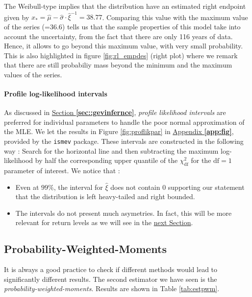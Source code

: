 The Weibull-type implies that the distribution have an estimated right endpoint given by $\hat{x}_*=\hat{\mu}-\hat{\sigma}\cdot\hat{\xi}^{-1}=38.77$. Comparing this value with the maximum value of the series (=36.6) tells us that the sample properties of this model take into account the uncertainty, from the fact that there are only 116 years of data. Hence, it allows to go beyond this maximum value, with very small probability. This is also highlighted in figure \ref{fig:rl_empdes} (right plot) where we remark that there are still probabiliy mass beyond the minimum and the maximum values of the series.

\paragraph*{Profile log-likelihood intervals} 
As discussed in \hyperref[sec:g]{Section \textbf{\ref{sec::gevinfernce}}}, \emph{profile likelihood intervals} are preferred for individual parameters to handle the poor normal approximation of the MLE. We let the results in Figure \ref{fig:proflikpar} in \hyperref[app:fig]{Appendix \textbf{\ref{app:fig}}}, provided by the \texttt{ismev} package.
These intervals are constructed in the following way : Search for the horizontal line and then subtracting the maximum log-likelihood by half the corresponding upper quantile of the $\chi^2_{\text{df}}$ for the $\text{df}=1$ parameter of interest. We notice that :
\begin{itemize}
	\item Even at $99\%$, the interval for $\hat{\xi}$ does not contain 0 supporting our statement that the distribution is left heavy-tailed and right bounded.
	\item The intervals do not present much asymetries. In fact, this will be more relevant for return levels as we will see in the \hyperref[sec:rlemp]{next Section}.
\end{itemize}


\subsection*{Probability-Weighted-Moments}

It is always a good practice to check if different methods would lead to significantly different results.
The second estimator we have seen is the \emph{probability-weighted-moments}. Results are shown in Table \ref{tab:estpwm}.

